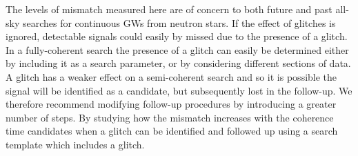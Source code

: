 \documentclass[../full_thesis/full_thesis.tex]{subfiles}
\begin{document}
The levels of mismatch measured here are of concern to both future and past
all-sky searches for continuous GWs from neutron stars. If the effect of
glitches is ignored, detectable signals could easily by missed due to the
presence of a glitch. In a fully-coherent search the presence of a glitch can
easily be determined either by including it as a search parameter, or by
considering different sections of data. A glitch has a weaker effect on a
semi-coherent search and so it is possible the signal will be identified as a
candidate, but subsequently lost in the follow-up.  We therefore recommend
modifying follow-up procedures by introducing a greater number of steps. By
studying how the mismatch increases with the coherence time candidates when a
glitch can be identified and followed up using a search template which includes
a glitch.

\end{document}
